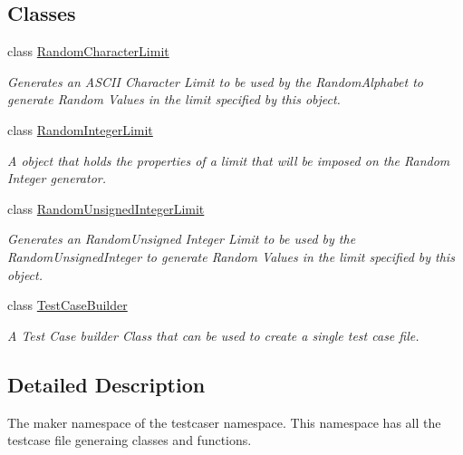 \subsection*{Classes}
\begin{DoxyCompactItemize}
\item 
class \mbox{\hyperlink{classtestcaser_1_1maker_1_1RandomCharacterLimit}{Random\+Character\+Limit}}
\begin{DoxyCompactList}\small\item\em Generates an A\+S\+C\+II Character Limit to be used by the Random\+Alphabet to generate Random Values in the limit specified by this object. \end{DoxyCompactList}\item 
class \mbox{\hyperlink{classtestcaser_1_1maker_1_1RandomIntegerLimit}{Random\+Integer\+Limit}}
\begin{DoxyCompactList}\small\item\em A object that holds the properties of a limit that will be imposed on the Random Integer generator. \end{DoxyCompactList}\item 
class \mbox{\hyperlink{classtestcaser_1_1maker_1_1RandomUnsignedIntegerLimit}{Random\+Unsigned\+Integer\+Limit}}
\begin{DoxyCompactList}\small\item\em Generates an Random\+Unsigned Integer Limit to be used by the Random\+Unsigned\+Integer to generate Random Values in the limit specified by this object. \end{DoxyCompactList}\item 
class \mbox{\hyperlink{classtestcaser_1_1maker_1_1TestCaseBuilder}{Test\+Case\+Builder}}
\begin{DoxyCompactList}\small\item\em A Test Case builder Class that can be used to create a single test case file. \end{DoxyCompactList}\end{DoxyCompactItemize}


\subsection{Detailed Description}
The maker namespace of the testcaser namespace. This namespace has all the testcase file generaing classes and functions. 

